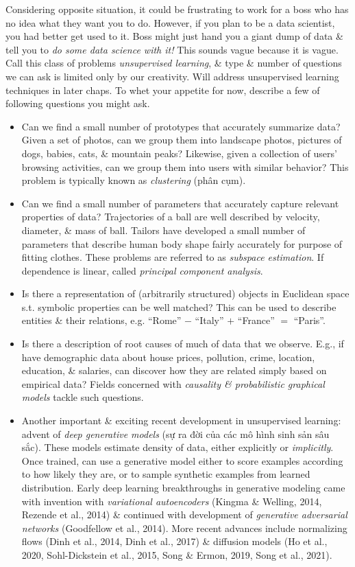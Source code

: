 \documentclass{article}
\begin{document}
\begin{itemize}
\begin{itemize}
\begin{itemize}
			Considering opposite situation, it could be frustrating to work for a boss who has no idea what they want you to do. However, if you plan to be a data scientist, you had better get used to it. Boss might just hand you a giant dump of data \& tell you to {\it do some data science with it!} This sounds vague because it is vague. Call this class of problems {\it unsupervised learning}, \& type \& number of questions we can ask is limited only by our creativity. Will address unsupervised learning techniques in later chaps. To whet your appetite for now, describe a few of following questions you might ask.
			\begin{itemize}
				\item Can we find a small number of prototypes that accurately summarize data? Given a set of photos, can we group them into landscape photos, pictures of dogs, babies, cats, \& mountain peaks? Likewise, given a collection of users' browsing activities, can we group them into users with similar behavior? This problem is typically known as {\it clustering} (phân cụm).
				\item Can we find a small number of parameters that accurately capture relevant properties of data? Trajectories of a ball are well described by velocity, diameter, \& mass of ball. Tailors have developed a small number of parameters that describe human body shape fairly accurately for purpose of fitting clothes. These problems are referred to as {\it subspace estimation}. If dependence is linear, called {\it principal component analysis}.
				\item Is there a representation of (arbitrarily structured) objects in Euclidean space s.t. symbolic properties can be well matched? This can be used to describe entities \& their relations, e.g. ``Rome'' $-$ ``Italy'' $+$ ``France'' $=$ ``Paris''.
				\item Is there a description of root causes of much of data that we observe. E.g., if have demographic data about house prices, pollution, crime, location, education, \& salaries, can discover how they are related simply based on empirical data? Fields concerned with {\it causality \& probabilistic graphical models} tackle such questions.
				\item Another important \& exciting recent development in unsupervised learning: advent of {\it deep generative models} (sự ra đời của các mô hình sinh sản sâu sắc). These models estimate density of data, either explicitly or {\it implicitly}. Once trained, can use a generative model either to score examples according to how likely they are, or to sample synthetic examples from learned distribution. Early deep learning breakthroughs in generative modeling came with invention with {\it variational autoencoders} (Kingma \& Welling, 2014, Rezende et al., 2014) \& continued with development of {\it generative adversarial networks} (Goodfellow et al., 2014). More recent advances include normalizing flows (Dinh et al., 2014, Dinh et al., 2017) \& diffusion models (Ho et al., 2020,  Sohl-Dickstein et al., 2015, Song \& Ermon, 2019, Song et al., 2021).

\end{itemize}
\end{itemize}
\end{itemize}
\end{itemize}
\end{document}
